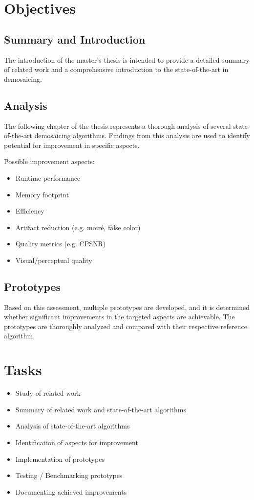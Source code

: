 \documentclass[english,notitlepage,smartquotes]{hgbreport}
\begin{document}
\section{Objectives} %

\subsection{Summary and Introduction}

The introduction of the master's thesis is intended to provide a detailed summary of related work and a comprehensive introduction to the state-of-the-art in demosaicing.

\subsection{Analysis}

The following chapter of the thesis represents a thorough analysis of several state-of-the-art demosaicing algorithms. Findings from this analysis are used to identify potential for improvement in specific aspects.

\noindent
Possible improvement aspects:

\begin{itemize}
	\item Runtime performance
	\item Memory footprint
	\item Efficiency
	\item Artifact reduction (e.g. moiré, false color)
	\item Quality metrics (e.g. CPSNR)
	\item Visual/perceptual quality
\end{itemize}

\subsection{Prototypes}

Based on this assessment, multiple prototypes are developed, and it is determined whether significant improvements in the targeted aspects are achievable. The prototypes are thoroughly analyzed and compared with their respective reference algorithm.

\section{Tasks}

\begin{itemize}
	\item Study of related work
	\item Summary of related work and state-of-the-art algorithms
	\item Analysis of state-of-the-art algorithms
	\item Identification of aspects for improvement
	\item Implementation of prototypes
	\item Testing / Benchmarking prototypes
	\item Documenting achieved improvements
\end{itemize}
\end{document}
